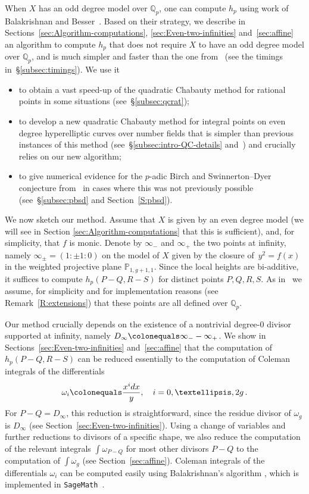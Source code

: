 \documentclass[11pt, a4paper]{amsart}
\newcommand{\PP}{\mathbb{P}}
\newcommand{\Q}{\mathbb{Q}}
\theoremstyle{remark}
\numberwithin{equation}{section}
\begin{document}
When $X$ has an odd degree model over $\Q_p$, one can compute $h_p$
using work of 
Balakrishnan and Besser~\cite{BBHeights}. 
Based on their strategy, we describe  in Sections~\ref{sec:Algorithm-computations}, \ref{sec:Even-two-infinities}  and~\ref{sec:affine}
an algorithm  to compute $h_p$ that does not
require $X$ to have an odd degree model over $\Q_p$, and
is much simpler and faster than the one from~\cite{BBHeights}  (see the
timings in~\S\ref{subsec:timings}).  
We use it 
\begin{itemize}
  \item to obtain a vast speed-up of the quadratic Chabauty method for
rational points in some situations (see~\S\ref{subsec:qcrat});
\item    to develop a new
quadratic Chabauty method for integral points on even degree
hyperelliptic curves over number fields that is simpler than previous
instances of this method
(see~\S\ref{subsec:intro-QC-details} and~\cite{LinQC}) and crucially relies
on our new algorithm;
    \item to give numerical evidence for  the
$p$-adic Birch and Swinnerton--Dyer conjecture from~\cite{BMS16}
in cases where this was not previously possible
(see~\S\ref{subsec:pbsd} and Section~\ref{S:pbsd}).
\end{itemize}

We now sketch our method.
Assume that $X$ is given by an even degree model (we will see in Section \ref{sec:Algorithm-computations} that this is sufficient), and, for simplicity, that $f$ is monic. Denote by $\infty_-$ and
$\infty_+$ the two points at infinity, namely 
  $\infty_{\pm} = (1:\pm 1:0)$ on the model of $X$ given by the closure of~$y^2=f(x)$ in the weighted
  projective plane $\PP_{1,g+1,1}$.
Since the local heights are bi-additive, it suffices to compute $h_p(P-Q,R-S)$
for distinct points $P,Q,R,S$.
As in~\cite{BBHeights} we assume,  for simplicity and for implementation
reasons (see Remark~\ref{R:extensions})
that these points are all defined over $\Q_p$.

Our method crucially depends on the existence of a nontrivial
degree-0 divisor supported at infinity, namely $D_\infty\colonequals \infty_- - \infty_+$. 
We show in Sections~\ref{sec:Even-two-infinities} and~\ref{sec:affine} that the computation of $h_p(P-Q,R-S)$ can be reduced essentially to the 
computation of Coleman integrals of the differentials 
$$\omega_i\colonequals \frac{x^idx}{y},\quad i=0,\ldots,2g\,. $$
For $P-Q=D_\infty$, this reduction is straightforward, since the residue
divisor of $\omega_g$ is $D_\infty$ (see
Section~\ref{sec:Even-two-infinities}).
Using a change of variables and further reductions to divisors of a specific shape,
we also reduce the computation of the relevant integrals $\int
\omega_{P-Q}$ for most other divisors $P-Q$ to the computation of $\int
\omega_g$ (see Section~\ref{sec:affine}).
Coleman integrals of the differentials $\omega_i$ 
can be computed easily using Balakrishnan's algorithm
\cite{Jen-Even-Degree-CI}, which is implemented in {\tt SageMath}~\cite{Sage}.
\end{document}
